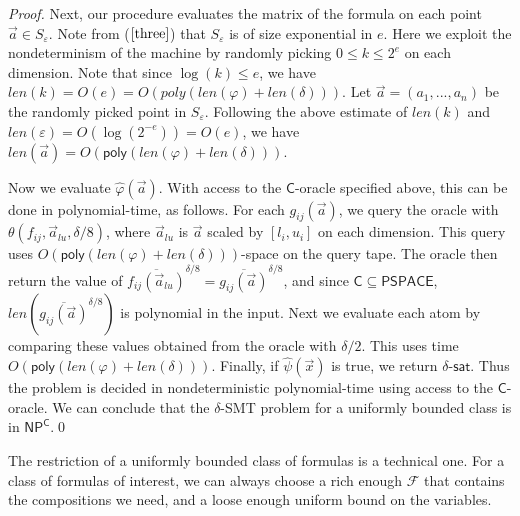 \documentclass[prodmode]{acmsmall} %
\newcommand{\len}{\mathit{len}}
\newcommand{\poly}{\mathsf{poly}}
\begin{document}
\begin{proof}
Next, our procedure evaluates the matrix of the formula on each point $\vec a\in S_{\varepsilon}$. Note from ($\ref{three}$) that $S_{\varepsilon}$ is of size exponential in $e$. Here we exploit the nondeterminism of the machine by randomly picking $0\leq k\leq 2^e$ on each dimension. Note that since $\log(k)\leq e$, we have $\len(k) = O(e) = O(poly(\len(\varphi)+\len(\delta)))$. Let $\vec a = (a_1,...,a_n)$ be the randomly picked point in $S_{\varepsilon}$. Following the above estimate of $\len(k)$ and $\len(\varepsilon) = O(\log(2^{-e}))= O(e)$, we have $\len(\vec a) = O(\poly(\len(\varphi)+\len(\delta)))$. 

Now we evaluate $\widehat{\varphi}(\vec a)$. With access to the $\mathsf{C}$-oracle specified above, this can be done in polynomial-time, as follows. For each $g_{ij}(\vec a)$, we query the oracle with $\theta(f_{ij}, \vec a_{lu}, \delta/8)$, where $\vec a_{lu}$ is $\vec a$ scaled by $[l_i, u_i]$ on each dimension. This query uses $O(\poly(\len(\varphi)+\len(\delta)))$-space on the query tape. The oracle then return the value of $\overline{f_{ij}(\vec a_{lu})}^{\delta/8}= \overline{g_{ij}(\vec a)}^{\delta/8}$, and since $\mathsf{C}\subseteq \mathsf{PSPACE}$, $\len(\overline{g_{ij}(\vec a)}^{\delta/8})$ is polynomial in the input. Next we evaluate each atom by comparing these values obtained from the oracle with $\delta/2$. This uses time $O(\poly(\len(\varphi)+\len(\delta)))$. Finally, if $\widehat{\psi}(\vec x)$ is true, we return $\delta$-$\mathsf{sat}$. Thus the problem is decided in nondeterministic polynomial-time using access to the $\mathsf{C}$-oracle. We can conclude that the $\delta$-SMT problem for a uniformly bounded class is in $\mathsf{NP^C}$.\qed
\end{proof}
\begin{remark}
The restriction of a uniformly bounded class of formulas is a technical one. For a class of formulas of interest, we can always choose a rich enough $\mathcal{F}$ that contains the compositions we need, and a loose enough uniform bound on the variables. 
\end{remark}
\end{document}
